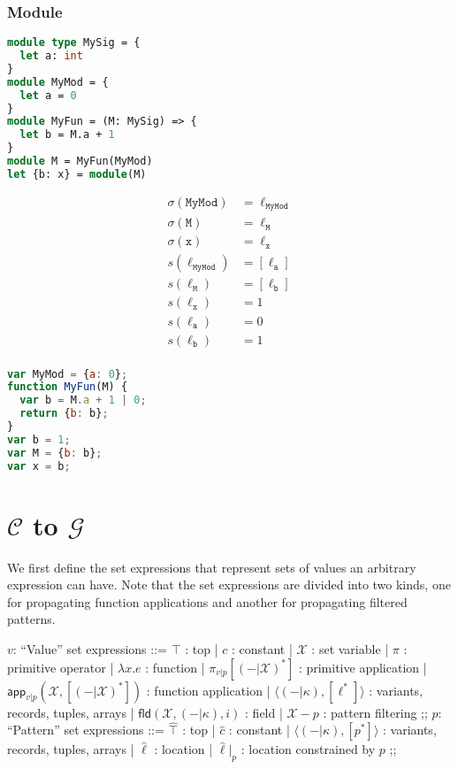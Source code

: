 \documentclass[a4paper]{article}
\newcommand*\vbar{|}
\begin{document}
\subsubsection{Module}
\begin{minipage}[t]{0.5\textwidth}
\begin{lstlisting}[language=Caml]
module type MySig = {
  let a: int
}
module MyMod = {
  let a = 0
}
module MyFun = (M: MySig) => {
  let b = M.a + 1
}
module M = MyFun(MyMod)
let {b: x} = module(M)
\end{lstlisting}
\end{minipage}%
\begin{minipage}[t]{0.5\textwidth}
\begin{align*}
  \sigma(\mathtt{MyMod}) &= \ell_{\mathtt{MyMod}}\\
  \sigma(\mathtt{M}) &= \ell_{\mathtt{M}}\\
  \sigma(\mathtt{x}) &= \ell_{\mathtt{x}}\\
  s(\ell_{\mathtt{MyMod}}) &= [\ell_{\mathtt{a}}]\\
  s(\ell_{\mathtt{M}}) &= [\ell_{\mathtt{b}}]\\
  s(\ell_{\mathtt{x}}) &= 1\\
  s(\ell_{\mathtt{a}}) &= 0\\
  s(\ell_{\mathtt{b}}) &= 1\\
\end{align*}
\end{minipage}

\begin{lstlisting}[language=JavaScript]
var MyMod = {a: 0};
function MyFun(M) {
  var b = M.a + 1 | 0;
  return {b: b};
}
var b = 1;
var M = {b: b};
var x = b;
\end{lstlisting}

\section{$\mathcal{C}$ to $\mathcal{G}$}
We first define the set expressions that represent sets of values an arbitrary expression can have. Note that the set expressions are divided into two kinds, one for propagating function applications and another for propagating filtered patterns.

\begin{bnfgrammar}[rrcll]
$v$: ``Value'' set expressions ::=
   $\top$ : top
  | $c$ : constant
  | $\mathcal{X}$ : set variable
  | $\pi$ : primitive operator
  | $\lambda x.e$ : function
  | $\pi_{v\vbar p}[(-\vbar\mathcal{X})^*]$ : primitive application
  | $\mathsf{app}_{v\vbar p} (\mathcal{X}, [(-\vbar\mathcal{X})^*])$ : function application
  | $\langle(-\vbar\kappa), [\ell^*]\rangle$ : variants, records, tuples, arrays
  | $\mathsf{fld}(\mathcal{X}, (-\vbar\kappa), i)$ : field
  | $\mathcal{X} - p$ : pattern filtering
;;
$p$: ``Pattern'' set expressions ::=
    $\hat \top$ : top
  | $\hat c$ : constant
  | $\langle(-\vbar\kappa),[p^*]\rangle$ : variants, records, tuples, arrays
  | $\hat \ell$ : location
  | $\hat \ell \vbar_{p}$ : location constrained by $p$
;;
\end{bnfgrammar}
\end{document}
